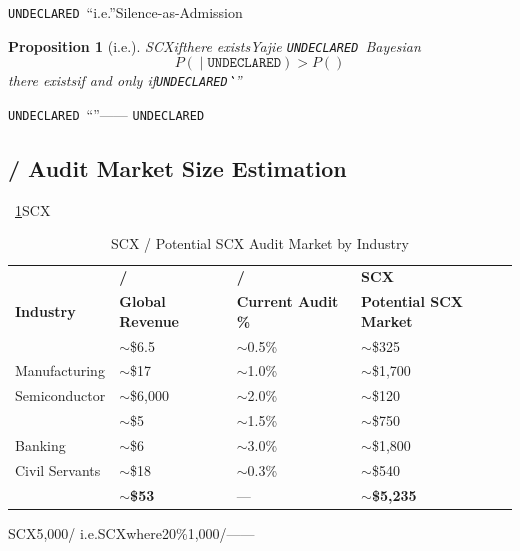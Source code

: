 \documentclass[12pt,a4paper]{article}
\newtheorem{proposition}[theorem]{Proposition}
\theoremstyle{remark}
\newcommand{\undeclared}{\texttt{UNDECLARED}}
\begin{document}
\undeclared\ ``i.e.''Silence-as-Admission

\begin{proposition}[i.e.]
SCXifthere existsYajie \undeclared\ Bayesian
\begin{equation}
    P(\text{} \mid \undeclared) > P(\text{})
\end{equation}
there existsif and only if\undeclared\``''
\end{proposition}

\undeclared\ ``''——
\undeclared\

\subsection{ / Audit Market Size Estimation}

~\ref{tab:market_size}SCX

\begin{table}[H]
\centering
\caption{SCX / Potential SCX Audit Market by Industry}
\label{tab:market_size}
\begin{tabular}{@{}p{2.5cm}p{2.5cm}p{2.5cm}p{2.5cm}@{}}
\toprule
\textbf{} & \textbf{/} & \textbf{/} & \textbf{SCX} \\
\textbf{Industry} & \textbf{Global Revenue} & \textbf{Current Audit \%} & \textbf{Potential SCX Market} \\
\midrule
 & \ensuremath{\sim}\$6.5 & \ensuremath{\sim}0.5\% & \ensuremath{\sim}\$325 \\
Manufacturing & \ensuremath{\sim}\$17 & \ensuremath{\sim}1.0\% & \ensuremath{\sim}\$1,700 \\
Semiconductor & \ensuremath{\sim}\$6,000 & \ensuremath{\sim}2.0\% & \ensuremath{\sim}\$120 \\
 & \ensuremath{\sim}\$5 & \ensuremath{\sim}1.5\% & \ensuremath{\sim}\$750 \\
Banking & \ensuremath{\sim}\$6 & \ensuremath{\sim}3.0\% & \ensuremath{\sim}\$1,800 \\
Civil Servants & \ensuremath{\sim}\$18 & \ensuremath{\sim}0.3\% & \ensuremath{\sim}\$540 \\
\midrule
\textbf{} & \textbf{\ensuremath{\sim}\$53} & — & \textbf{\ensuremath{\sim}\$5,235} \\
\bottomrule
\end{tabular}
\end{table}

SCX5,000/
i.e.SCXwhere20\%1,000/——

\end{document}
